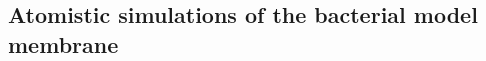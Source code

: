 \subsection{Atomistic simulations of the bacterial model membrane} \label{sec:lip_atom_bact}


\begin{figure}
\centering
\begin{minipage}{9.42cm}
\centering
{} 
\end{minipage}
\begin{minipage}{5.7cm}
\centering
{}
\end{minipage}
\begin{minipage}{5.7cm}
\centering
{} 

\end{minipage}
\end{figure}
